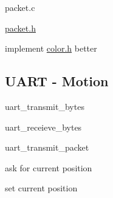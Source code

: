 
\begin{DoxyItemize}
\item packet.\+c
\item \hyperlink{packet_8h}{packet.\+h}
\item implement \hyperlink{color_8h}{color.\+h} better
\end{DoxyItemize}

\subsection*{U\+A\+RT -\/ Motion }


\begin{DoxyItemize}
\item uart\+\_\+transmit\+\_\+bytes
\item uart\+\_\+receieve\+\_\+bytes
\item uart\+\_\+transmit\+\_\+packet
\item ask for current position
\item set current position 
\end{DoxyItemize}